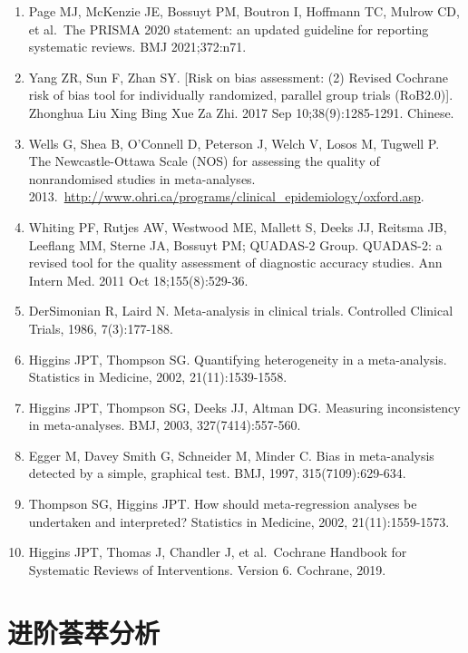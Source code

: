 \documentclass[
  chinese-hans,
  letterpaper,
  DIV=11,
  numbers=noendperiod]{scrreprt}
\begin{document}
\begin{enumerate}
\def\labelenumi{\arabic{enumi}.}
\item
  Page MJ, McKenzie JE, Bossuyt PM, Boutron I, Hoffmann TC, Mulrow CD,
  et al.~The PRISMA 2020 statement: an updated guideline for reporting
  systematic reviews. BMJ 2021;372:n71.
\item
  Yang ZR, Sun F, Zhan SY. {[}Risk on bias assessment: (2) Revised
  Cochrane risk of bias tool for individually randomized, parallel group
  trials (RoB2.0){]}. Zhonghua Liu Xing Bing Xue Za Zhi. 2017 Sep
  10;38(9):1285-1291. Chinese.
\item
  Wells G, Shea B, O'Connell D, Peterson J, Welch V, Losos M, Tugwell P.
  The Newcastle-Ottawa Scale (NOS) for assessing the quality of
  nonrandomised studies in meta-analyses.
  2013.~\url{http://www.ohri.ca/programs/clinical_epidemiology/oxford.asp}.
\item
  Whiting PF, Rutjes AW, Westwood ME, Mallett S, Deeks JJ, Reitsma JB,
  Leeflang MM, Sterne JA, Bossuyt PM; QUADAS-2 Group. QUADAS-2: a
  revised tool for the quality assessment of diagnostic accuracy
  studies. Ann Intern Med. 2011 Oct 18;155(8):529-36.
\item
  DerSimonian R, Laird N. Meta-analysis in clinical trials. Controlled
  Clinical Trials, 1986, 7(3):177-188.
\item
  Higgins JPT, Thompson SG. Quantifying heterogeneity in a
  meta-analysis. Statistics in Medicine, 2002, 21(11):1539-1558.
\item
  Higgins JPT, Thompson SG, Deeks JJ, Altman DG. Measuring inconsistency
  in meta-analyses. BMJ, 2003, 327(7414):557-560.
\item
  Egger M, Davey Smith G, Schneider M, Minder C. Bias in meta-analysis
  detected by a simple, graphical test. BMJ, 1997, 315(7109):629-634.
\item
  Thompson SG, Higgins JPT. How should meta-regression analyses be
  undertaken and interpreted? Statistics in Medicine, 2002,
  21(11):1559-1573.
\item
  Higgins JPT, Thomas J, Chandler J, et al.~Cochrane Handbook for
  Systematic Reviews of Interventions. Version 6. Cochrane, 2019.
\end{enumerate}


\chapter{进阶荟萃分析}\label{ux8fdbux9636ux835fux8403ux5206ux6790}
\end{document}
